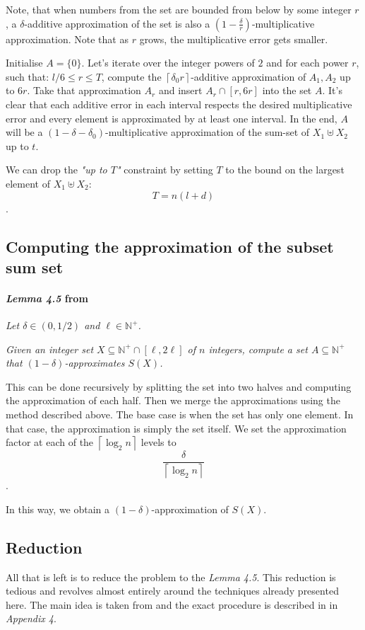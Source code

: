 Note, that when numbers from the set are bounded from below by some integer $r$, a \(\delta\)-additive approximation of the set is also a \((1 - \tfrac{\delta}{r})\)-multiplicative approximation. Note that as $r$ grows, the multiplicative error gets smaller.

Initialise $A=\{0\}$. Let's iterate over the integer powers of $2$ and for each power $r$, such that: $l/6 \le r \le T$, compute the $\left\lceil \delta_0r \right\rceil$-additive  approximation of $A_1, A_2$ up to $6r$. Take that approximation $A_r$ and insert $A_r \cap [r, 6r]$ into the set $A$. It's clear that each additive error in each interval respects the desired multiplicative error and every element is approximated by at least one interval. In the end, $A$ will be a \((1 - \delta - \delta_0)\)-multiplicative approximation of the sum-set of $X_1 \uplus X_2$ up to $t$. 

We can drop the \textit{"up to $T$"} constraint by setting $T$ to the bound on the largest element of $X_1 \uplus X_2$: \[T = n  (l + d)\].

\subsection{Computing the approximation of the subset sum set}
\paragraph{\textit{Lemma 4.5} from \cite{deng}} \textit{Let \( \delta \in (0, 1/2) \) and \( \ell \in \mathbb{N}^+ \).}

\textit{Given an integer set \( X \subseteq \mathbb{N}^+ \cap [\ell, 2\ell] \) of \( n \) integers, compute a set \( A \subseteq \mathbb{N}^+ \) that \( (1 - \delta) \)-approximates \( S(X) \).}

This can be done recursively by splitting the set into two halves and computing the approximation of each half. Then we merge the approximations using the method described above. The base case is when the set has only one element. In that case, the approximation is simply the set itself. We set the approximation factor at each of the $\left \lceil \log_2n \right \rceil$ levels to 
\[\frac{\delta}{\left \lceil \log_2n \right \rceil} \]. 

In this way, we obtain a $(1 - \delta)$-approximation of $S(X)$.

\subsection{Reduction}
All that is left is to reduce the \Partition problem to the \textit{Lemma 4.5}. This reduction is tedious and revolves almost entirely around the techniques already presented here. The main idea is taken from \cite{mucha} and the exact procedure is described in \cite{deng} in \textit{Appendix 4}.

